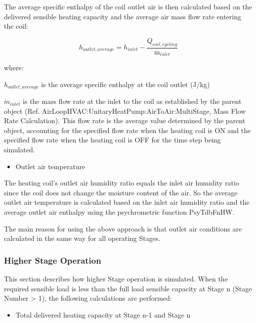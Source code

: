 The average specific enthalpy of the coil outlet air is then calculated based on the delivered sensible heating capacity and the average air mass flow rate entering the coil:

\begin{equation}
  h_{outlet,average} = h_{inlet} - \frac{Q_{coil,cycling}}{{\mathop m\limits^\cdot }_{inlet}}
\end{equation}

where:

\emph{h\(_{outlet,average}\)} is the average specific enthalpy at the coil outlet (J/kg)

\({\dot{m}_{inlet}}\) is the mass flow rate at the inlet to the coil as established by the parent object (Ref. AirLoopHVAC:UnitaryHeatPump:AirToAir:MultiStage, Mass Flow Rate Calculation). This flow rate is the average value determined by the parent object, accounting for the specified flow rate when the heating coil is ON and the specified flow rate when the heating coil is OFF for the time step being simulated.

\begin{itemize}
  \item Outlet air temperature
\end{itemize}

The heating coil's outlet air humidity ratio equals the inlet air humidity ratio since the coil does not change the moisture content of the air. So the average outlet air temperature is calculated based on the inlet air humidity ratio and the average outlet air enthalpy using the psychrometric function PsyTdbFnHW.

The main reason for using the above approach is that outlet air conditions are calculated in the same way for all operating Stages.

\subsubsection{Higher Stage Operation}\label{higher-stage-operation}

This section describes how higher Stage operation is simulated. When the required sensible load is less than the full load sensible capacity at Stage n (Stage Number \textgreater{} 1), the following calculations are performed:

\begin{itemize}
  \item Total delivered heating capacity at Stage n-1 and Stage n
\end{itemize}

